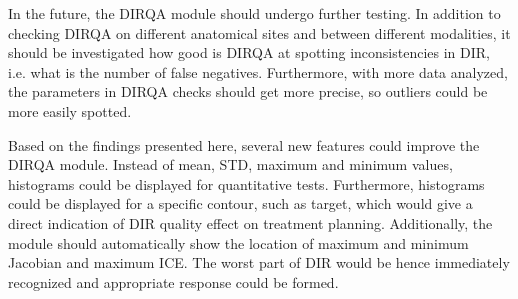 \documentclass[type=dr, dr=rernat, accentcolor=tud7b,colorbacktitle, bigchapter, openright, twoside, 12pt ]{tudthesis}
\begin{document}
In the future, the DIRQA module should undergo further testing. In addition to checking DIRQA on different anatomical sites and between different modalities, 
it should be investigated how good is DIRQA at spotting inconsistencies in DIR, i.e. what is the number of false negatives. Furthermore, with more
data analyzed, the parameters in DIRQA checks should get more precise, so outliers could be more easily spotted.

Based on the findings presented here, several new features could improve the DIRQA module. Instead of mean, STD, maximum and minimum values, histograms could be displayed for quantitative tests.
Furthermore, histograms could be displayed for a specific contour, such as target, which would give a direct indication of DIR quality effect on treatment planning. 
Additionally, the module should automatically show the location of maximum and minimum Jacobian and maximum ICE.
The worst part of DIR would be hence immediately recognized and appropriate response could be formed.  


{}
% 
\end{document}
